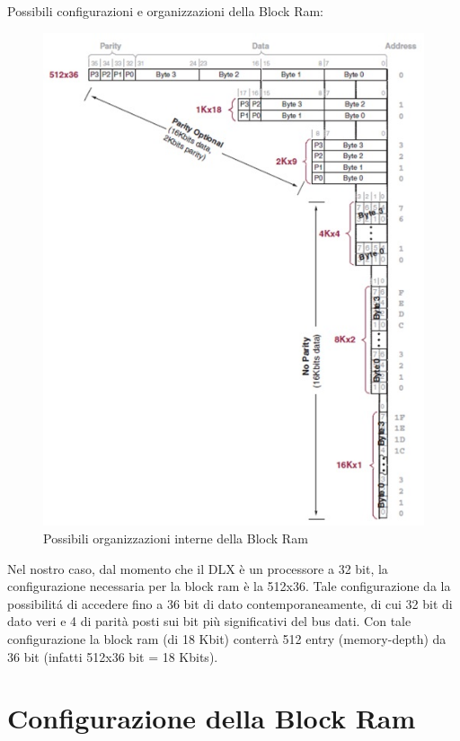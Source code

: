 Possibili configurazioni e organizzazioni della Block Ram:\\

\begin{figure}[!h]
\centering
\includegraphics[width=\textwidth]{img/blockRam/organInterna.jpg}
\caption{Possibili organizzazioni interne della Block Ram}
\label{fig:set_ass}
\end{figure}

Nel nostro caso, dal momento che il DLX \`e un processore a 32 bit, la configurazione necessaria per la block ram \`e la 512x36. Tale configurazione da la possibilit\'a di accedere fino a 36 bit di dato contemporaneamente, di cui 32 bit di dato veri e 4 di parit\`a posti sui bit pi\`u significativi del bus dati. Con tale configurazione la block ram (di 18 Kbit) conterr\`a 512 entry (memory-depth) da 36 bit (infatti 512x36 bit = 18 Kbits).

\section{Configurazione della Block Ram}

